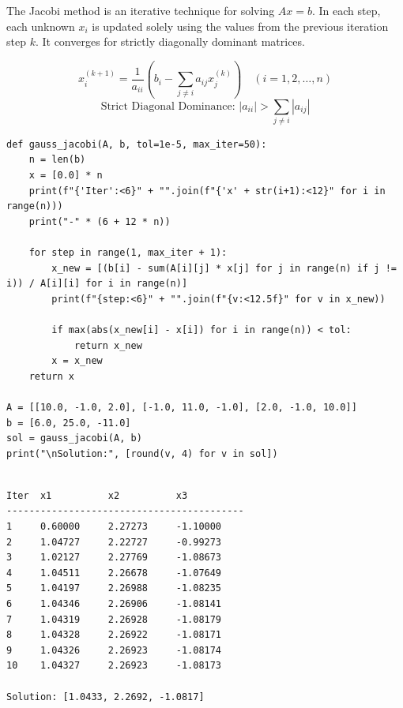 \documentclass[10pt,a4paper]{report}
\begin{document}
The Jacobi method is an iterative technique for solving $A x = b$. In each step, each unknown $x_i$ is updated solely using the values from the previous iteration step $k$. It converges for strictly diagonally dominant matrices.

\begin{tcolorbox}[colback=theorybg,colframe=theoryframe,title=\textbf{Mathematical Theory \& Formulation},boxrule=1pt,arc=2mm]
\[
x_i^{(k+1)} = \frac{1}{a_{ii}}\left(b_i - \sum_{j \neq i} a_{ij} x_j^{(k)}\right) \quad (i = 1, 2, \dots, n)
\]
\[
\text{Strict Diagonal Dominance: } |a_{ii}| > \sum_{j \neq i} |a_{ij}|
\]
\end{tcolorbox}

\begin{tcolorbox}[colback=codebg,colframe=secondary,title=\textbf{Python Implementation (Step-by-Step Functions)},boxrule=1pt,arc=2mm]
\begin{lstlisting}[style=python_detailed]
def gauss_jacobi(A, b, tol=1e-5, max_iter=50):
    n = len(b)
    x = [0.0] * n
    print(f"{'Iter':<6}" + "".join(f"{'x' + str(i+1):<12}" for i in range(n)))
    print("-" * (6 + 12 * n))

    for step in range(1, max_iter + 1):
        x_new = [(b[i] - sum(A[i][j] * x[j] for j in range(n) if j != i)) / A[i][i] for i in range(n)]
        print(f"{step:<6}" + "".join(f"{v:<12.5f}" for v in x_new))

        if max(abs(x_new[i] - x[i]) for i in range(n)) < tol:
            return x_new
        x = x_new
    return x

A = [[10.0, -1.0, 2.0], [-1.0, 11.0, -1.0], [2.0, -1.0, 10.0]]
b = [6.0, 25.0, -11.0]
sol = gauss_jacobi(A, b)
print("\nSolution:", [round(v, 4) for v in sol])


\end{lstlisting}
\end{tcolorbox}

\begin{tcolorbox}[colback=termbg,colframe=primary,title=\textbf{Program Execution Output \& Convergence Table},boxrule=1pt,arc=2mm]
\begin{lstlisting}[style=terminal_output]
Iter  x1          x2          x3          
------------------------------------------
1     0.60000     2.27273     -1.10000    
2     1.04727     2.22727     -0.99273    
3     1.02127     2.27769     -1.08673    
4     1.04511     2.26678     -1.07649    
5     1.04197     2.26988     -1.08235    
6     1.04346     2.26906     -1.08141    
7     1.04319     2.26928     -1.08179    
8     1.04328     2.26922     -1.08171    
9     1.04326     2.26923     -1.08174    
10    1.04327     2.26923     -1.08173    

Solution: [1.0433, 2.2692, -1.0817]
\end{lstlisting}
\end{tcolorbox}
\end{document}
